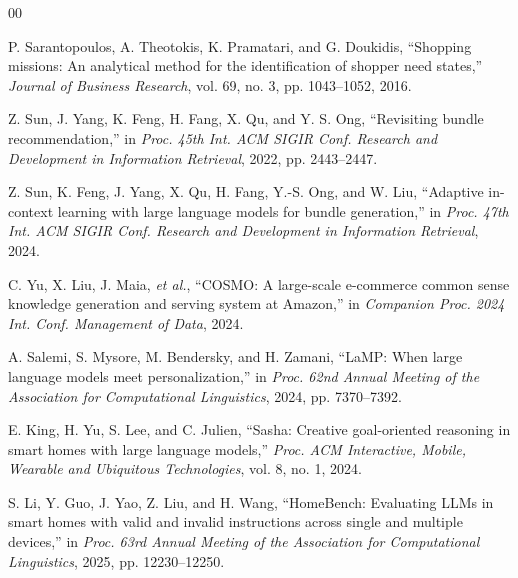 \documentclass[conference]{IEEEtran}
\begin{document}
\begin{thebibliography}{00}

P. Sarantopoulos, A. Theotokis, K. Pramatari, and G. Doukidis, ``Shopping missions: An analytical method for the identification of shopper need states,'' \emph{Journal of Business Research}, vol. 69, no. 3, pp. 1043--1052, 2016.

Z. Sun, J. Yang, K. Feng, H. Fang, X. Qu, and Y. S. Ong, ``Revisiting bundle recommendation,'' in \emph{Proc. 45th Int. ACM SIGIR Conf. Research and Development in Information Retrieval}, 2022, pp. 2443--2447.

Z. Sun, K. Feng, J. Yang, X. Qu, H. Fang, Y.-S. Ong, and W. Liu, ``Adaptive in-context learning with large language models for bundle generation,'' in \emph{Proc. 47th Int. ACM SIGIR Conf. Research and Development in Information Retrieval}, 2024.

C. Yu, X. Liu, J. Maia, \emph{et al.}, ``COSMO: A large-scale e-commerce common sense knowledge generation and serving system at Amazon,'' in \emph{Companion Proc. 2024 Int. Conf. Management of Data}, 2024.

A. Salemi, S. Mysore, M. Bendersky, and H. Zamani, ``LaMP: When large language models meet personalization,'' in \emph{Proc. 62nd Annual Meeting of the Association for Computational Linguistics}, 2024, pp. 7370--7392.

E. King, H. Yu, S. Lee, and C. Julien, ``Sasha: Creative goal-oriented reasoning in smart homes with large language models,'' \emph{Proc. ACM Interactive, Mobile, Wearable and Ubiquitous Technologies}, vol. 8, no. 1, 2024.

S. Li, Y. Guo, J. Yao, Z. Liu, and H. Wang, ``HomeBench: Evaluating LLMs in smart homes with valid and invalid instructions across single and multiple devices,'' in \emph{Proc. 63rd Annual Meeting of the Association for Computational Linguistics}, 2025, pp. 12230--12250.

\end{thebibliography}
\end{document}
